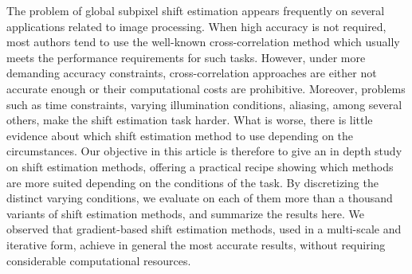 \documentclass{ipol}
\begin{document}



\begin{ipolAbstract}
The problem of global subpixel shift estimation appears frequently on several applications
related to image processing. When  high accuracy is not required, most authors tend to
use the well-known cross-correlation method which usually meets the performance
requirements for such tasks. However, under more demanding accuracy constraints,
cross-correlation approaches are either not accurate enough or their computational
costs are prohibitive. Moreover, problems such as time constraints, varying illumination
conditions, aliasing, among several others, make the shift estimation task harder.
What is worse, there is little evidence about which shift estimation method to use
depending on the circumstances. Our objective in this article is therefore to give an
in depth study on shift estimation methods, offering a practical recipe showing 
which methods are more suited depending on the conditions of the task. By discretizing 
the distinct varying conditions, we evaluate on each of them more than a thousand 
variants of shift estimation methods, and summarize the results here. We observed that 
gradient-based shift estimation methods, used in a multi-scale and iterative form, 
achieve in general the most accurate results, without requiring considerable 
computational resources. 
\end{ipolAbstract}

\end{document}
